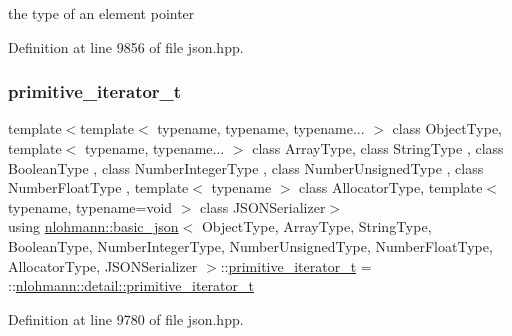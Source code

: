 the type of an element pointer 



Definition at line 9856 of file json.\+hpp.

\mbox{\label{classnlohmann_1_1basic__json_a2b38de408edf89649e8bd3abcfdff038}} 
\subsubsection{\texorpdfstring{primitive\+\_\+iterator\+\_\+t}{primitive\_iterator\_t}}
{\footnotesize\ttfamily template$<$template$<$ typename, typename, typename... $>$ class Object\+Type, template$<$ typename, typename... $>$ class Array\+Type, class String\+Type , class Boolean\+Type , class Number\+Integer\+Type , class Number\+Unsigned\+Type , class Number\+Float\+Type , template$<$ typename $>$ class Allocator\+Type, template$<$ typename, typename=void $>$ class J\+S\+O\+N\+Serializer$>$ \\
using \hyperlink{classnlohmann_1_1basic__json}{nlohmann\+::basic\+\_\+json}$<$ Object\+Type, Array\+Type, String\+Type, Boolean\+Type, Number\+Integer\+Type, Number\+Unsigned\+Type, Number\+Float\+Type, Allocator\+Type, J\+S\+O\+N\+Serializer $>$\+::\hyperlink{classnlohmann_1_1basic__json_a2b38de408edf89649e8bd3abcfdff038}{primitive\+\_\+iterator\+\_\+t} =  \+::\hyperlink{classnlohmann_1_1detail_1_1primitive__iterator__t}{nlohmann\+::detail\+::primitive\+\_\+iterator\+\_\+t}\hspace{0.3cm}{\ttfamily [private]}}



Definition at line 9780 of file json.\+hpp.

\mbox{\label{classnlohmann_1_1basic__json_ac6a5eddd156c776ac75ff54cfe54a5bc}} 
